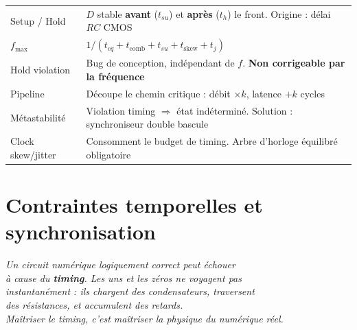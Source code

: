 \documentclass[12pt,a4paper,twoside]{book}
\begin{document}
\begin{ingenieur}[title={\color{white} Résumé --- Niveau Ingénieur}]
\begin{center}
\renewcommand{\arraystretch}{1.3}
\begin{tabular}{p{3.5cm}p{9.5cm}}
\toprule
Setup / Hold & $D$ stable \textbf{avant} ($t_{su}$) et \textbf{après} ($t_h$) le front. Origine : délai $RC$ CMOS \\
$f_{\max}$ & $1/(t_{cq}+t_{\text{comb}}+t_{su}+t_{\text{skew}}+t_j)$ \\
Hold violation & Bug de conception, indépendant de $f$. \textbf{Non corrigeable par la fréquence} \\
Pipeline & Découpe le chemin critique : débit $\times k$, latence $+k$ cycles \\
Métastabilité & Violation timing $\Rightarrow$ état indéterminé. Solution : synchroniseur double bascule \\
Clock skew/jitter & Consomment le budget de timing. Arbre d'horloge équilibré obligatoire \\
\bottomrule
\end{tabular}
\end{center}
\end{ingenieur}


\chapter{Contraintes temporelles et synchronisation}

\begin{center}
\textit{Un circuit numérique logiquement correct peut échouer\\
à cause du \textbf{timing}. Les uns et les zéros ne voyagent pas\\
instantanément : ils chargent des condensateurs, traversent\\
des résistances, et accumulent des retards.\\
Maîtriser le timing, c'est maîtriser la physique du numérique réel.}
\end{center}
\end{document}
